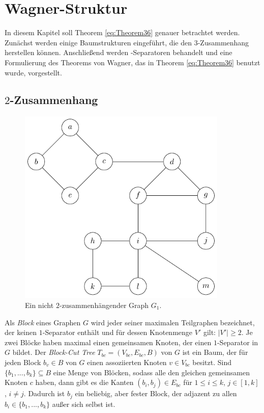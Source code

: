 \chapter{Wagner-Struktur}
\label{cha:wagnerstruktur}

In diesem Kapitel soll Theorem \ref{eq:Theorem36} genauer betrachtet werden.
Zunächst werden einige Baumstrukturen eingeführt, die den $3$-Zusammenhang herstellen können.
Anschließend werden \dd-Separatoren behandelt und eine Formulierung des Theorems von Wagner, das in Theorem \ref{eq:Theorem36} benutzt wurde, vorgestellt.

\section{$2$-Zusammenhang}

\begin{figure}[H]
  \centering
  \includegraphics[width=10cm,keepaspectratio]{bilder/1-Block-Tree1.pdf}
  \caption{Ein nicht $2$-zusammenhängender Graph $G_1$.}
  \label{fig:1-Block-Tree1}
\end{figure}
\begin{definition}
  Als \emph{Block} eines Graphen $G$ wird jeder seiner maximalen Teilgraphen bezeichnet, der keinen $1$-Separator enthält und für dessen Knotenmenge $V'$ gilt: $\vert V' \vert \geq 2$.
  Je zwei Blöcke haben maximal einen gemeinsamen Knoten, der einen $1$-Separator in $G$ bildet.
  Der \emph{Block-Cut Tree} $T_{bc} = (V_{bc}, E_{bc}, B)$ von $G$ ist ein Baum, der für jeden Block $b_v \in B$ von $G$ einen assoziierten Knoten $v \in V_{bc}$ besitzt.
  Sind $\{b_1, ..., b_k\} \subseteq B$ eine Menge von Blöcken, sodass alle den gleichen gemeinsamen Knoten $c$ haben, dann gibt es die Kanten $(b_i, b_j) \in E_{bc}$ für $1 \leq i \leq k$, $j \in [1, k]$, $i \neq j$.
  Dadurch ist $b_j$ ein beliebig, aber fester Block, der adjazent zu allen $b_i \in \{b_1, ..., b_k\}$ außer sich selbst ist.
\end{definition}
